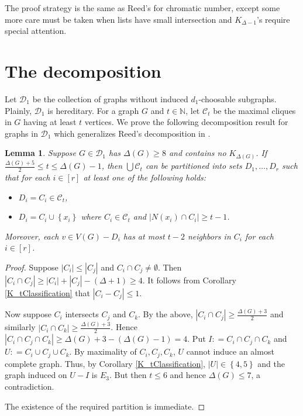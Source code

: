 \documentclass[12pt]{article}
\theoremstyle{plain}
\newtheorem{lem}[thm]{Lemma}
\theoremstyle{definition}
\theoremstyle{remark}
\newcommand{\fancy}[1]{\mathcal{#1}}
\newcommand{\IN}{\mathbb{N}}
\newcommand{\CC}{\fancy{C}}
\newcommand{\D}{\fancy{D}}
\newcommand{\set}[1]{\left\{ #1 \right\}}
\newcommand{\card}[1]{\left|#1\right|}
\newcommand{\irange}[1]{\left[#1\right]}
\newcommand{\DefinedAs}{\mathrel{\mathop:}=}
\begin{document}
The proof strategy is the same as Reed's \cite{reed1999strengthening} for
chromatic number, except some more care must be taken when lists have small
intersection and $K_{\Delta-1}$'s require special attention.

\section{The decomposition}
Let $\D_1$ be the collection of graphs without induced $d_1$-choosable
subgraphs.  Plainly, $\D_1$ is hereditary. For a graph $G$ and $t \in \IN$, let
$\CC_t$ be the maximal cliques in $G$ having at least $t$ vertices. We prove the
following decomposition result for graphs in $\D_1$ which generalizes Reed's decomposition in \cite{reed1999strengthening}.

\begin{lem}\label{partition}
Suppose $G \in \D_1$ has $\Delta(G) \geq 8$ and contains no $K_{\Delta(G)}$. If
$\frac{\Delta(G) + 5}{2} \leq t \leq \Delta(G) - 1$, then $\bigcup \CC_t$ can be
partitioned into sets $D_1, \ldots, D_r$ such that for each $i \in \irange{r}$
at least one of the following holds:
\begin{itemize}
  \item $D_i = C_i \in \CC_t$,
  \item $D_i = C_i \cup \set{x_i}$ where $C_i \in \CC_t$ and $\card{N(x_i) \cap
  C_i} \geq t-1$.
\end{itemize}

\noindent Moreover, each $v \in V(G) - D_i$ has at most $t-2$ neighbors in $C_i$  for each $i \in \irange{r}$.
\end{lem}
\begin{proof}
Suppose $\card{C_i} \leq \card{C_j}$ and $C_i \cap C_j \neq \emptyset$. 
Then $\card{C_i \cap C_j} \geq \card{C_i} + \card{C_j} - (\Delta + 1) \geq 4$.  It follows from Corollary
\ref{K_tClassification} that $\card{C_i - C_j} \leq 1$.

Now suppose $C_i$ intersects $C_j$ and $C_k$.  By the above,
$\card{C_i \cap C_j} \geq \frac{\Delta(G) + 3}{2}$ and similarly $\card{C_i \cap
C_k} \geq \frac{\Delta(G) + 3}{2}$.  Hence $\card{C_i \cap C_j \cap C_k} \geq
\Delta(G) + 3 - (\Delta(G) - 1) = 4$.  Put $I \DefinedAs C_i \cap C_j \cap C_k$
and $U \DefinedAs C_i \cup C_j \cup C_k$.  By maximality of $C_i, C_j, C_k$,
$U$ cannot induce an almost complete graph.  Thus, by Corollary
\ref{K_tClassification}, $\card{U} \in \set{4, 5}$ and the graph induced on $U -
I$ is $E_3$.  But then $t \leq 6$ and hence $\Delta(G) \leq 7$, a contradiction.

\smallskip

\noindent The existence of the required partition is immediate. 
\end{proof}
\end{document}
